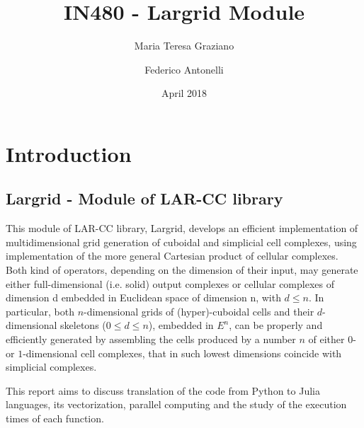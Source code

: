 \documentclass{article}
\title{IN480 - Largrid Module}
\author{Maria Teresa Graziano \and Federico Antonelli}
\date{April 2018}
\begin{document}
\maketitle

\tableofcontents

\section{Introduction}
\subsection{Largrid - Module of LAR-CC library}
This module of LAR-CC library, Largrid, develops an efficient implementation of multidimensional grid generation of cuboidal and simplicial cell complexes, using implementation of the more general Cartesian product of cellular complexes.
Both kind of operators, depending on the dimension of their input, may generate either full-dimensional (i.e. solid) output complexes or cellular complexes of dimension d embedded in Euclidean space of dimension n, with $d \leq n$. 
In particular, both $n$-dimensional grids of (hyper)-cuboidal cells and their $d$-dimensional skeletons ($0\leq d\leq n$), embedded in $E^n$, can be properly and efficiently generated by assembling the cells produced by a number $n$ of either $0$- or $1$-dimensional cell complexes, that in such lowest dimensions coincide with simplicial complexes\citep{largrid}.

This report aims to discuss translation of the code from Python to Julia languages, its vectorization, parallel computing and the study of the execution times of each function.
\end{document}
